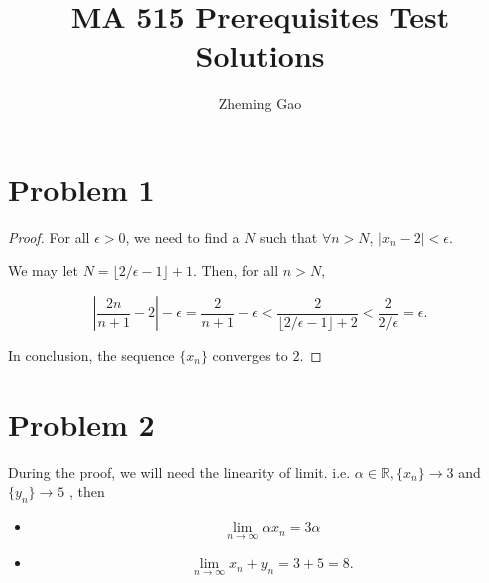 \documentclass[12pt]{article}
\begin{document}
 
 
\title{MA 515 Prerequisites Test Solutions}
\author{Zheming Gao}
\maketitle

\section*{Problem 1}

\begin{proof}

For all $\epsilon > 0$, we need to find a $N$ such that $\forall n > N$, $|x_n - 2| < \epsilon$.

We may let $N = \lfloor{2/\epsilon - 1} \rfloor + 1$. Then, for all $n > N$, 

$$
|\frac{2n}{n+1} - 2| - \epsilon = \frac{2}{n+1} - \epsilon < \frac{2}{\lfloor{2/\epsilon - 1} \rfloor + 2} < \frac{2}{2/\epsilon} = \epsilon.
$$

In conclusion, the sequence $\{x_n\}$ converges to $2$.

\end{proof}


\section*{Problem 2}
During the proof, we will need the linearity of limit. i.e.
$\alpha \in \mathbb{R}, \{x_n\} \rightarrow 3$ and $\{y_n\} \rightarrow 5$ , then
\begin{itemize}
\item 
$$
\lim_{n\rightarrow \infty}\alpha x_n = 3\alpha
$$

\item
$$
\lim_{n\rightarrow \infty} x_n + y_n = 3 + 5 = 8.
$$
\end{itemize}
\end{document}
